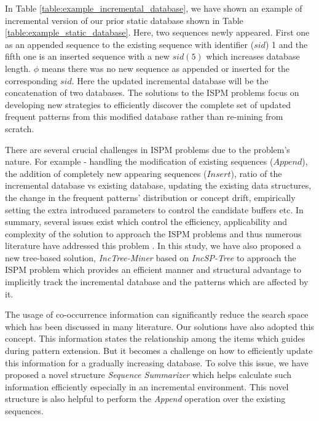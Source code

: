In Table \ref{table:example_incremental_database}, we have shown an example of incremental version of our prior static database shown in Table \ref{table:example_static_database}. Here, two sequences newly appeared. First one as an appended sequence to the existing sequence with identifier ($sid$) 1 and the fifth one is an inserted sequence with a new $sid(5)$ which increases database length. $\phi$ means there was no new sequence as appended or inserted for the corresponding $sid$. Here the updated incremental database will be the concatenation of two databases. The solutions to the ISPM problems focus on developing new strategies to efficiently discover the complete set of updated frequent patterns from this modified database rather than re-mining from scratch.     

There are several crucial challenges in ISPM problems due to the problem's nature. For example - handling the modification of existing sequences ($Append$), the addition of completely new appearing sequences ($Insert$), ratio of the incremental database vs existing database, updating the existing data structures, the change in the frequent patterns' distribution or concept drift, empirically setting the extra introduced parameters to control the candidate buffers
\cite{cheng2004incspan,lin2015incrementally} etc. In summary, several issues exist which control the efficiency, applicability and complexity of the solution to approach the ISPM problems and thus numerous literature have addressed this problem \cite{lin2004incremental,cheng2004incspan,liu2012incremental,lin2015incrementally,saleti2019mapreduce}. In this study, we have also proposed a new tree-based solution, \textit{IncTree-Miner} based on \textit{IncSP-Tree} to approach the ISPM problem which provides an efficient manner and structural advantage to implicitly track the incremental database and the patterns which are affected by it.
 

The usage of co-occurrence information can significantly reduce the search space which has been discussed in many literature\cite{fournier2014fast,fournier2017survey,saleti2019mapreduce}. Our solutions have also adopted this concept. This information states the relationship among the items which guides during pattern extension. But it becomes a challenge on how to efficiently update this information for a gradually increasing database. To solve this issue, we have proposed a novel structure \textit{Sequence Summarizer} which helps calculate such information efficiently especially in an incremental environment. This novel structure is also helpful to perform the \textit{Append} operation over the existing sequences.

